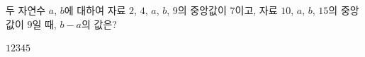 두 자연수 $a$, $b$에 대하여 자료 $2$, $4$, $a$, $b$, $9$의 중앙값이 $7$이고, 자료 $10$, $a$, $b$, $15$의 중앙값이 $9$일 때, $b-a$의 값은? 
\begin{choices32}{$1$}{$2$}{$3$}{$4$}{$5$}\end{choices32}
